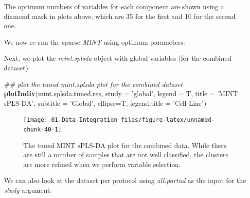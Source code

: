 \documentclass[]{book}
\newenvironment{Shaded}{\begin{snugshade}}{\end{snugshade}}
\newcommand{\CommentTok}[1]{\textcolor[rgb]{0.56,0.35,0.01}{\textit{#1}}}
\newcommand{\DataTypeTok}[1]{\textcolor[rgb]{0.13,0.29,0.53}{#1}}
\newcommand{\DecValTok}[1]{\textcolor[rgb]{0.00,0.00,0.81}{#1}}
\newcommand{\KeywordTok}[1]{\textcolor[rgb]{0.13,0.29,0.53}{\textbf{#1}}}
\newcommand{\NormalTok}[1]{#1}
\newcommand{\OperatorTok}[1]{\textcolor[rgb]{0.81,0.36,0.00}{\textbf{#1}}}
\newcommand{\StringTok}[1]{\textcolor[rgb]{0.31,0.60,0.02}{#1}}
\theoremstyle{definition}
\theoremstyle{definition}
\theoremstyle{definition}
\theoremstyle{remark}
\begin{document}
The optimum numbers of variables for each component are shown using a
diamond mark in plots above, which are 35 for the first and 10 for the
second one.

We now re-run the sparse \emph{MINT} using optimum parameters:

\begin{Shaded}
\end{Shaded}

Next, we plot the \emph{mint.splsda} object with global variables (for
the combined dataset):

\begin{Shaded}
\begin{Highlighting}[]
\CommentTok{## plot the tuned mint.splsda plot for the combined dataset}
\KeywordTok{plotIndiv}\NormalTok{(mint.splsda.tuned.res, }\DataTypeTok{study =} \StringTok{'global'}\NormalTok{, }\DataTypeTok{legend =}\NormalTok{ T,}
          \DataTypeTok{title =} \StringTok{'MINT sPLS-DA'}\NormalTok{,  }\DataTypeTok{subtitle =} \StringTok{'Global'}\NormalTok{, }\DataTypeTok{ellipse=}\NormalTok{T, }\DataTypeTok{legend.title =} \StringTok{'Cell Line'}\NormalTok{)}
\end{Highlighting}
\end{Shaded}

\begin{figure}[ht]

{\centering \texttt{[image: 01-Data-Integration\_files/figure-latex/unnamed-chunk-40-1]} 

}

\caption{The tuned MINT sPLS-DA plot for the combined data. While there are still a number of samples that are not well classified, the clusters are more refined when we perform variable selection.}\label{fig:unnamed-chunk-40}
\end{figure}

We can also look at the dataset per protocol using \emph{all.partial} as
the input for the \emph{study} argument:
\end{document}
